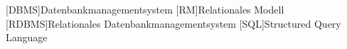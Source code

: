 \section*{\acronymHeading}


\begin{acronym}
    [DBMS]{Datenbankmanagementsystem}
    [RM]{Relationales Modell}
    [RDBMS]{Relationales Datenbankmanagementsystem}
    [SQL]{Structured Query Language}
\end{acronym}